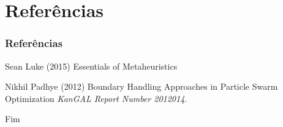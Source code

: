 \documentclass{beamer}
\begin{document}
\section{Referências}

\begin{frame}
\frametitle{Referências}
\footnotesize{
\begin{thebibliography}{99} %
 Sean Luke (2015)
\newblock Essentials of Metaheuristics

 Nikhil Padhye (2012)
\newblock Boundary Handling Approaches in Particle Swarm Optimization
\newblock \emph{KanGAL Report Number 2012014}.

\end{thebibliography}
}
\end{frame}


\begin{frame}
\Huge{\centerline{Fim}}
\end{frame}

\end{document}
